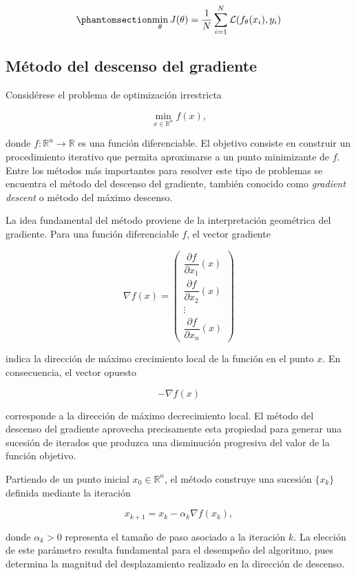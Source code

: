 \documentclass[
  spanish,
  us-letterpaper,
]{scrreprt}
\theoremstyle{definition}
\theoremstyle{remark}
\begin{document}
\begin{equation}\phantomsection\label{eq-entrenamiento}{
\min_{\theta} J(\theta) = \frac{1}{N} \sum_{i=1}^{N} \mathcal{L}(f_\theta(x_i), y_i)
}\end{equation}

\subsection{Método del descenso del
gradiente}\label{muxe9todo-del-descenso-del-gradiente}

Considérese el problema de optimización irrestricta

\[
\min_{x \in \mathbb{R}^n} f(x),
\]

donde \(f:\mathbb{R}^n \to \mathbb{R}\) es una función diferenciable. El
objetivo consiste en construir un procedimiento iterativo que permita
aproximarse a un punto minimizante de \(f\). Entre los métodos más
importantes para resolver este tipo de problemas se encuentra el método
del descenso del gradiente, también conocido como \emph{gradient
descent} o método del máximo descenso.

La idea fundamental del método proviene de la interpretación geométrica
del gradiente. Para una función diferenciable \(f\), el vector gradiente

\[
\nabla f(x)
=
\begin{pmatrix}
\dfrac{\partial f}{\partial x_1}(x) \\
\dfrac{\partial f}{\partial x_2}(x) \\
\vdots \\
\dfrac{\partial f}{\partial x_n}(x)
\end{pmatrix}
\]

indica la dirección de máximo crecimiento local de la función en el
punto \(x\). En consecuencia, el vector opuesto

\[
-\nabla f(x)
\]

corresponde a la dirección de máximo decrecimiento local. El método del
descenso del gradiente aprovecha precisamente esta propiedad para
generar una sucesión de iterados que produzca una disminución progresiva
del valor de la función objetivo.

Partiendo de un punto inicial \(x_0 \in \mathbb{R}^n\), el método
construye una sucesión \(\{x_k\}\) definida mediante la iteración

\[
x_{k+1}
=
x_k - \alpha_k \nabla f(x_k),
\]

donde \(\alpha_k > 0\) representa el tamaño de paso asociado a la
iteración \(k\). La elección de este parámetro resulta fundamental para
el desempeño del algoritmo, pues determina la magnitud del
desplazamiento realizado en la dirección de descenso.
\end{document}
